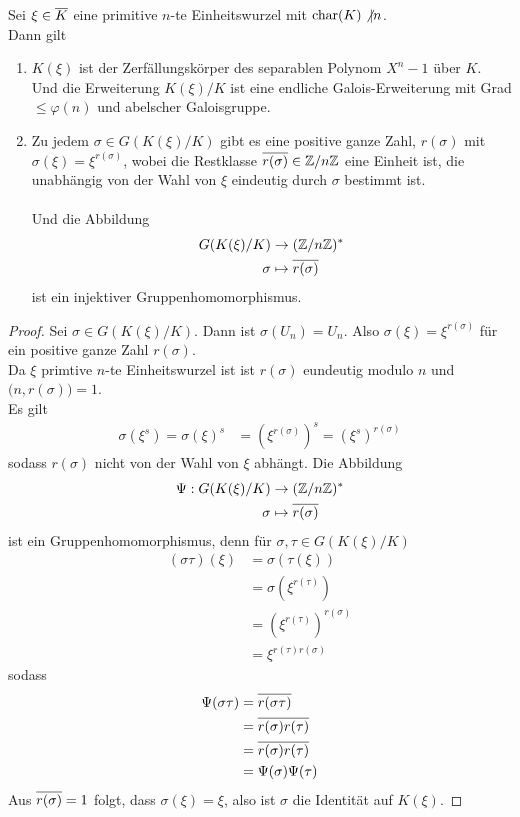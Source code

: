 	\begin{satz}
		Sei $\xi\in\overline{K}$ eine primitive $n$-te Einheitswurzel mit $\operatorname{char}(K)\not|n$.\\
		Dann gilt
		\begin{enumerate}
			\item $K(\xi)$ ist der Zerfällungskörper des separablen Polynom $X^n-1$ über $K$.\\
			Und die Erweiterung $K(\xi)/K$ ist eine endliche Galois-Erweiterung mit Grad $\leq\varphi(n)$ und abelscher Galoisgruppe.
			\item Zu jedem $\sigma\in G(K(\xi)/K)$ gibt es eine positive ganze Zahl, $r(\sigma)$ mit $\sigma(\xi)=\xi^{r(\sigma)}$, wobei die Restklasse $\overline{r(\sigma)}\in \mathbb{Z}/n\mathbb{Z}$ eine Einheit ist, die unabhängig von der Wahl von $\xi$ eindeutig durch $\sigma$ bestimmt ist.\\
			\\
			Und die Abbildung
			\begin{align*}
			G(K(\xi)/K)&\to(\mathbb{Z}/n\mathbb{Z})^*\\
			\sigma&\mapsto\overline{r(\sigma)}
			\end{align*}
			ist ein injektiver Gruppenhomomorphismus.
		\end{enumerate}
	\end{satz}
	\begin{proof}
		\item Sei $\sigma\in G(K(\xi)/K)$. Dann ist $\sigma(U_n)=U_n$. Also $\sigma(\xi)=\xi^{r(\sigma)}$ für ein positive ganze Zahl $r(\sigma)$.\\
		Da $\xi$ primtive $n$-te Einheitswurzel ist ist $r(\sigma)$ eundeutig modulo $n$ und $\big(n,r(\sigma)\big)=1$.\\
		Es gilt
		\begin{align*}
		\sigma(\xi^s)=\sigma(\xi)^s&=(\xi^{r(\sigma)})^{s}=(\xi^s)^{r(\sigma)}
		\end{align*}
		sodass $r(\sigma)$ nicht von der Wahl von $\xi$ abhängt. Die Abbildung
		\begin{align*}
		\Psi:G(K(\xi)/K)&\to (\mathbb{Z}/n\mathbb{Z})^*\\
		\sigma&\mapsto\overline{r(\sigma)}
		\end{align*}
		ist ein Gruppenhomomorphismus, denn für $\sigma,\tau \in G(K(\xi)/K)$
		\begin{align*}
		(\sigma\tau)(\xi)&=\sigma(\tau(\xi))\\
		&=\sigma(\xi^{r(\tau)})\\
		&=(\xi^{r(\tau)})^{r(\sigma)}\\
		&=\xi^{r(\tau)r(\sigma)}
		\end{align*}
		sodass
		\begin{align*}
		\Psi(\sigma\tau)&=\overline{r(\sigma\tau)}\\
		&=\overline{r(\sigma)r(\tau)}\\
		&=\overline{r(\sigma)}\overline{r(\tau)}\\
		&=\Psi(\sigma)\Psi(\tau)
		\end{align*}
		Aus $\overline{r(\sigma)}=1$ folgt, dass $\sigma(\xi)=\xi$, also ist $\sigma$ die Identität auf $K(\xi)$.
	\end{proof}
	
